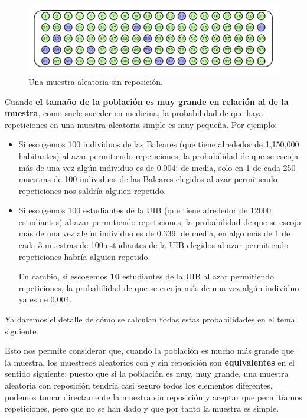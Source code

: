 \documentclass[
]{book}
\theoremstyle{definition}
\theoremstyle{definition}
\theoremstyle{definition}
\theoremstyle{definition}
\theoremstyle{remark}
\begin{document}
\begin{figure}

{\centering \includegraphics[width=0.8\linewidth]{INREMDN_files/figure-html/sinrepv} 

}

\caption{Una muestra aleatoria sin reposición.}\label{fig:sinrep}
\end{figure}

Cuando \textbf{el tamaño de la población es muy grande en relación al de la muestra}, como suele suceder en medicina, la probabilidad de que haya repeticiones en una muestra aleatoria simple es muy pequeña. Por ejemplo:

\begin{itemize}
\item
  Si escogemos 100 individuos de las Baleares (que tiene alrededor de 1,150,000 habitantes) al azar permitiendo repeticiones, la probabilidad de que se escoja más de una vez algún individuo es de 0.004: de media, solo en 1 de cada 250 muestras de 100 individuos de las Baleares elegidos al azar permitiendo repeticiones nos saldría alguien repetido.
\item
  Si escogemos 100 estudiantes de la UIB (que tiene alrededor de 12000 estudiantes) al azar permitiendo repeticiones, la probabilidad de que se escoja más de una vez algún individuo es de 0.339: de media, en algo más de 1 de cada 3 muestras de 100 estudiantes de la UIB elegidos al azar permitiendo repeticiones habría alguien repetido.

  En cambio, si escogemos \textbf{10} estudiantes de la UIB al azar permitiendo repeticiones, la probabilidad de que se escoja más de una vez algún individuo ya es de 0.004.
\end{itemize}

\begin{rmdnote}
Ya daremos el detalle de cómo se calculan todas estas probabilidades en el tema siguiente.
\end{rmdnote}

Esto nos permite considerar que, cuando la población es mucho más grande que la muestra, los muestreos aleatorios con y sin reposición son \textbf{equivalentes} en el sentido siguiente: puesto que si la población es muy, muy grande, una muestra aleatoria con reposición tendría casi seguro todos los elementos diferentes, podemos tomar directamente la muestra sin reposición y aceptar que permitíamos repeticiones, pero que no se han dado y que por tanto la muestra es simple.
\end{document}

